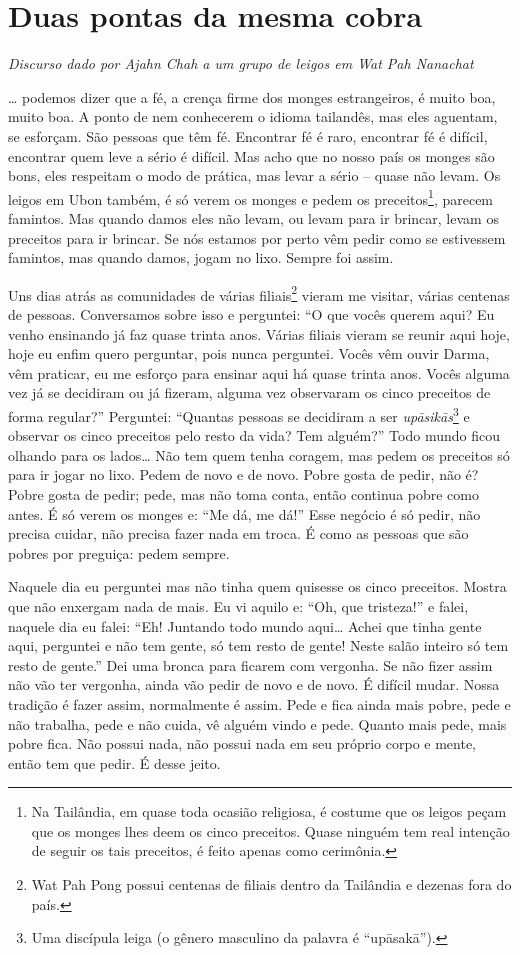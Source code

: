 
\chapter{Duas pontas da mesma cobra}

{\itshape
Discurso dado por Ajahn Chah a um grupo de leigos em Wat Pah Nanachat}

… podemos dizer que a fé, a crença firme dos monges estrangeiros, é
muito boa, muito boa. A ponto de nem conhecerem o idioma tailandês, mas
eles aguentam, se esforçam. São pessoas que têm fé. Encontrar fé é
raro, encontrar fé é difícil, encontrar quem leve a sério é difícil.
Mas acho que no nosso país os monges são bons, eles respeitam o modo de
prática, mas levar a sério – quase não levam. Os
leigos em Ubon também, é só verem os monges e pedem os
preceitos\footnote{Na Tailândia, em quase toda ocasião religiosa, é
costume que os leigos peçam que os monges lhes deem os cinco preceitos.
Quase ninguém tem real intenção de seguir os tais preceitos, é feito
apenas como cerimônia.}, parecem famintos. Mas quando damos eles não
levam, ou levam para ir brincar, levam os preceitos para ir brincar. Se
nós estamos por perto vêm pedir como se estivessem famintos, mas quando
damos, jogam no lixo. Sempre foi assim. 

Uns dias atrás as comunidades de várias filiais\footnote{Wat Pah
Pong possui centenas de filiais dentro da Tailândia e dezenas fora do
país.} vieram me visitar, várias centenas de pessoas. Conversamos sobre
isso e perguntei: “O que vocês querem aqui? Eu venho ensinando já faz
quase trinta anos. Várias filiais vieram se reunir aqui hoje, hoje eu
enfim quero perguntar, pois nunca perguntei. Vocês vêm ouvir Darma, vêm
praticar, eu me esforço para ensinar aqui há quase trinta anos. Vocês
alguma vez já se decidiram ou já fizeram, alguma vez observaram os
cinco preceitos de forma regular?” Perguntei: “Quantas pessoas se
decidiram a ser \textit{up\=asik\=as}\footnote{Uma discípula leiga (o
gênero masculino da palavra é “up\=asak\=a”).} e observar os
cinco preceitos pelo resto da vida? Tem alguém?” Todo mundo ficou
olhando para os lados… Não tem quem tenha coragem, mas pedem os
preceitos só para ir jogar no lixo. Pedem de novo e de novo. Pobre
gosta de pedir, não é? Pobre gosta de pedir; pede, mas não toma conta,
então continua pobre como antes. É só verem os monges e: “Me dá, me
dá!” Esse negócio é só pedir, não precisa cuidar, não precisa fazer
nada em troca. É como as pessoas que são pobres por
preguiça: pedem sempre. 

Naquele dia eu perguntei mas não tinha quem quisesse os cinco
preceitos. Mostra que não enxergam nada de mais. Eu vi aquilo e: “Oh,
que tristeza!” e falei, naquele dia eu falei: “Eh! Juntando todo mundo
aqui… Achei que tinha gente aqui, perguntei e não tem gente, só tem
resto de gente! Neste salão inteiro só tem resto de gente.” Dei uma
bronca para ficarem com vergonha. Se não fizer assim não vão ter
vergonha, ainda vão pedir de novo e de novo. É difícil mudar. Nossa
tradição é fazer assim, normalmente é assim. Pede e fica ainda mais
pobre, pede e não trabalha, pede e não cuida, vê alguém vindo e pede.
Quanto mais pede, mais pobre fica. Não possui nada, não possui nada em
seu próprio corpo e mente, então tem que pedir. É desse jeito.

